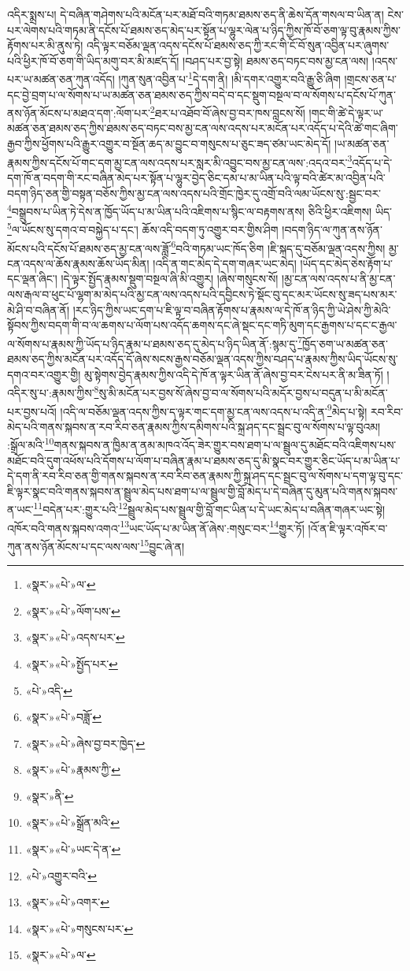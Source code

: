 འདིར་སྨྲས་པ། དེ་བཞིན་གཤེགས་པའི་མངོན་པར་མཐོ་བའི་གཏམ་ཐམས་ཅད་ནི་ཆེས་དོན་གསལ་བ་ཡིན་ན། ངེས་པར་ལེགས་པའི་གཏམ་ནི་དངོས་པོ་ཐམས་ཅད་མེད་པར་སྟོན་པ་ལྷུར་ལེན་པ་ཉིད་ཀྱིས་ཁོ་བོ་ཅག་ལྟ་བུ་རྣམས་ཀྱིས་རྟོགས་པར་མི་ནུས་ཏེ། འདི་ལྟར་བཅོམ་ལྡན་འདས་དངོས་པོ་ཐམས་ཅད་ཀྱི་རང་གི་ངོ་བོ་སུན་འབྱིན་པར་ཞུགས་པའི་ཕྱིར་ཁོ་བོ་ཅག་གི་ཡིད་མགུ་བར་མི་མཛད་དོ། །བཤད་པར་བྱ་སྟེ། ཐམས་ཅད་བཏང་བས་མྱ་ངན་ལས། །འདས་པར་ཡ་མཚན་ཅན་ཀུན་འདོད། །ཀུན་སུན་འབྱིན་པ་\footnote{«སྣར་»«པེ་»ལ་}དེ་དག་ནི། །མི་དགར་འགྱུར་བའི་རྒྱུ་ཅི་ཞིག །གྲངས་ཅན་པ་དང་བྱེ་བྲག་པ་ལ་སོགས་པ་ཡ་མཚན་ཅན་ཐམས་ཅད་ཀྱིས་བདེ་བ་དང་སྡུག་བསྔལ་བ་ལ་སོགས་པ་དངོས་པོ་ཀུན་ནས་ཉོན་མོངས་པ་མཐའ་དག་:ལོག་པར་\footnote{«སྣར་»«པེ་»ལོག་པས་}ཐར་པ་འཐོབ་བོ་ཞེས་བྱ་བར་ཁས་བླངས་སོ། །གང་གི་ཚེ་དེ་ལྟར་ཡ་མཚན་ཅན་ཐམས་ཅད་ཀྱིས་ཐམས་ཅད་བཏང་བས་མྱ་ངན་ལས་འདས་པར་མངོན་པར་འདོད་པ་དེའི་ཚེ་གང་ཞིག་རྒྱབ་ཀྱིས་ཕྱོགས་པའི་རྒྱུར་འགྱུར་བ་སྔོན་ཆད་མ་བྱུང་བ་གསུངས་པ་ཅུང་ཟད་ཙམ་ཡང་མེད་དོ། །ཡ་མཚན་ཅན་རྣམས་ཀྱིས་དངོས་པོ་གང་དག་མྱ་ངན་ལས་འདས་པར་སླར་མི་འབྱུང་བས་མྱ་ངན་ལས་:འདའ་བར་\footnote{«སྣར་»«པེ་»འདས་པར་}འདོད་པ་དེ་དག་ཁོ་ན་བདག་གི་རང་བཞིན་མེད་པར་སྟོན་པ་ལྷུར་བྱེད་ཅིང་དམ་པ་མ་ཡིན་པའི་ལྟ་བའི་ཚེར་མ་འབྱིན་པའི་བདག་ཉིད་ཅན་གྱི་བསྟན་བཅོས་ཀྱིས་མྱ་ངན་ལས་འདས་པའི་གྲོང་ཁྱེར་དུ་འགྲོ་བའི་ལམ་ཡོངས་སུ་:སྦྱང་བར་\footnote{«སྣར་»«པེ་»སྤྱོད་པར་}བསྒྲུབས་པ་ཡིན་ཏེ་དེས་ན་ཁྱོད་ཡོད་པ་མ་ཡིན་པའི་འཇིགས་པ་སྙིང་ལ་བརྟགས་ནས། ཅིའི་ཕྱིར་འཇིགས། ཡིད་\footnote{«པེ་»འདི་}ལ་ཡོངས་སུ་དགའ་བ་བསྐྱེད་པ་དང་། ཆོས་འདི་བདག་ཏུ་འགྱུར་བར་གྱིས་ཤིག །བདག་ཉིད་ལ་ཀུན་ནས་ཉོན་མོངས་པའི་དངོས་པོ་ཐམས་ཅད་མྱ་ངན་ལས་ཟློ་\footnote{«སྣར་»«པེ་»བཟློ་}བའི་གཏམ་ཡང་ཁོད་ཅིག །ཇི་སྐད་དུ་བཅོམ་ལྡན་འདས་ཀྱིས། མྱ་ངན་འདས་ལ་ཆོས་རྣམས་ཆོས་ཡོད་མིན། །འདི་ན་གང་མེད་དེ་དག་གཞར་ཡང་མེད། །ཡོད་དང་མེད་ཅེས་རྟོག་པ་དང་ལྡན་ཞིང་། །དེ་ལྟར་སྤྱོད་རྣམས་སྡུག་བསྔལ་ཞི་མི་འགྱུར། །ཞེས་གསུངས་སོ། །མྱ་ངན་ལས་འདས་པ་ནི་མྱ་ངན་ལས་རྒལ་བ་ཕུང་པོ་ལྷག་མ་མེད་པའི་མྱ་ངན་ལས་འདས་པའི་དབྱིངས་ཏེ་སྡོང་བུ་དང་མར་ཡོངས་སུ་ཟད་པས་མར་མེ་ཤི་བ་བཞིན་ནོ། །རང་ཉིད་ཀྱིས་ཡང་དག་པ་ཇི་ལྟ་བ་བཞིན་རྟོགས་པ་རྣམས་ལ་དེ་ཁོ་ན་ཉིད་ཀྱི་ཡེ་ཤེས་ཀྱི་མེའི་སྟོབས་ཀྱིས་བདག་གི་བ་ལ་ཆགས་པ་ལོག་པས་འདོད་ཆགས་དང་ཞེ་སྡང་དང་གཏི་མུག་དང་རྒྱགས་པ་དང་ང་རྒྱལ་ལ་སོགས་པ་རྣམས་ཀྱི་ཡོད་པ་ཉིད་རྣམ་པ་ཐམས་ཅད་དུ་མེད་པ་ཉིད་ཡིན་ནོ་:སྙམ་དུ་\footnote{«སྣར་»«པེ་»ཞེས་བྱ་བར་ཁྱེད་}ཁྱོད་ཅག་ཡ་མཚན་ཅན་ཐམས་ཅད་ཀྱིས་མངོན་པར་འདོད་དོ་ཞེས་སངས་རྒྱས་བཅོམ་ལྡན་འདས་ཀྱིས་བཤད་པ་རྣམས་ཀྱིས་ཡིད་ཡོངས་སུ་དགའ་བར་འགྱུར་གྱི། མུ་སྟེགས་བྱེད་རྣམས་ཀྱིས་འདི་དེ་ཁོ་ན་ལྟར་ཡིན་ནོ་ཞེས་བྱ་བར་ངེས་པར་ནི་མ་ཟིན་ཏོ། །འདིར་སུ་པ་:རྣམས་ཀྱིས་\footnote{«སྣར་»«པེ་»རྣམས་ཀྱི་}སུ་མི་མངོན་པར་བྱས་སོ་ཞེས་བྱ་བ་ལ་སོགས་པའི་མདོར་བྱས་པ་བདུན་པ་མི་མངོན་པར་བྱས་པའོ། །འདི་ལ་བཅོམ་ལྡན་འདས་ཀྱིས་ད་ལྟར་གང་དག་མྱ་ངན་ལས་འདས་པ་འདི་ན་\footnote{«སྣར་»ནི་}མེད་པ་སྟེ། རབ་རིབ་མེད་པའི་གནས་སྐབས་ན་རབ་རིབ་ཅན་རྣམས་ཀྱིས་དམིགས་པའི་སྐྲ་ཤད་དང་སྦྲང་བུ་ལ་སོགས་པ་ལྟ་བུའམ། :སྒྲོལ་མའི་\footnote{«སྣར་»«པེ་»སྒྲོན་མའི་}གནས་སྐབས་ན་ཁྱིམ་ན་ནམ་མཁའ་འོད་ཟེར་གྱུར་བས་ཐག་པ་ལ་སྦྲུལ་དུ་མཐོང་བའི་འཇིགས་པས་མཐོང་བའི་དུག་འཕོས་པའི་དོགས་པ་ལོག་པ་བཞིན་རྣམ་པ་ཐམས་ཅད་དུ་མི་སྣང་བར་གྱུར་ཅིང་ཡོད་པ་མ་ཡིན་པ་དེ་དག་ནི་རབ་རིབ་ཅན་གྱི་གནས་སྐབས་ན་རབ་རིབ་ཅན་རྣམས་ཀྱི་སྐྲ་ཤད་དང་སྦྲང་བུ་ལ་སོགས་པ་དག་ལྟ་བུ་དང་ཇི་ལྟར་སྣང་བའི་གནས་སྐབས་ན་སྦྲུལ་མེད་པས་ཐག་པ་ལ་སྦྲུལ་གྱི་བློ་མེད་པ་དེ་བཞིན་དུ་མུན་པའི་གནས་སྐབས་ན་ཡང་\footnote{«སྣར་»«པེ་»ཡང་དེ་ན་}བདེན་པར་:གྱུར་པའི་\footnote{«པེ་»འགྱུར་བའི་}སྦྲུལ་མེད་པས་སྦྲུལ་གྱི་བློ་གང་ཡིན་པ་དེ་ཡང་མེད་པ་བཞིན་གཞར་ཡང་སྟེ། འཁོར་བའི་གནས་སྐབས་འགའ་\footnote{«སྣར་»«པེ་»འགར་}ཡང་ཡོད་པ་མ་ཡིན་ནོ་ཞེས་:གསུང་བར་\footnote{«སྣར་»«པེ་»གསུངས་པར་}གྱུར་ཏོ། །འོ་ན་ཇི་ལྟར་འཁོར་བ་ཀུན་ནས་ཉོན་མོངས་པ་དང་ལས་ལས་\footnote{«སྣར་»«པེ་»ལ་}བྱུང་ཞེ་ན། 
